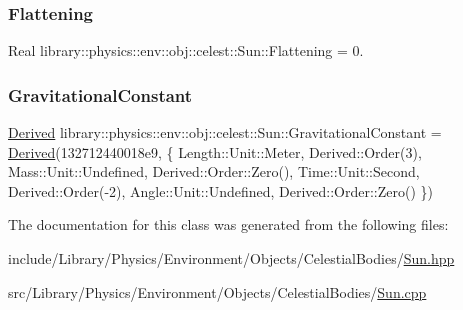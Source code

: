 \subsubsection{\texorpdfstring{Flattening}{Flattening}}
{\footnotesize\ttfamily Real library\+::physics\+::env\+::obj\+::celest\+::\+Sun\+::\+Flattening = 0.\hspace{0.3cm}{\ttfamily [static]}}

\mbox{\label{classlibrary_1_1physics_1_1env_1_1obj_1_1celest_1_1_sun_a83c05d07f32867a958d06d8c1141793d}} 
\subsubsection{\texorpdfstring{Gravitational\+Constant}{GravitationalConstant}}
{\footnotesize\ttfamily \hyperlink{classlibrary_1_1physics_1_1units_1_1_derived}{Derived} library\+::physics\+::env\+::obj\+::celest\+::\+Sun\+::\+Gravitational\+Constant = \hyperlink{classlibrary_1_1physics_1_1units_1_1_derived}{Derived}(132712440018e9, \{ Length\+::\+Unit\+::\+Meter, Derived\+::\+Order(3), Mass\+::\+Unit\+::\+Undefined, Derived\+::\+Order\+::\+Zero(), Time\+::\+Unit\+::\+Second, Derived\+::\+Order(-\/2), Angle\+::\+Unit\+::\+Undefined, Derived\+::\+Order\+::\+Zero() \})\hspace{0.3cm}{\ttfamily [static]}}



The documentation for this class was generated from the following files\+:\begin{DoxyCompactItemize}
\item 
include/\+Library/\+Physics/\+Environment/\+Objects/\+Celestial\+Bodies/\hyperlink{_sun_8hpp}{Sun.\+hpp}\item 
src/\+Library/\+Physics/\+Environment/\+Objects/\+Celestial\+Bodies/\hyperlink{_sun_8cpp}{Sun.\+cpp}\end{DoxyCompactItemize}
